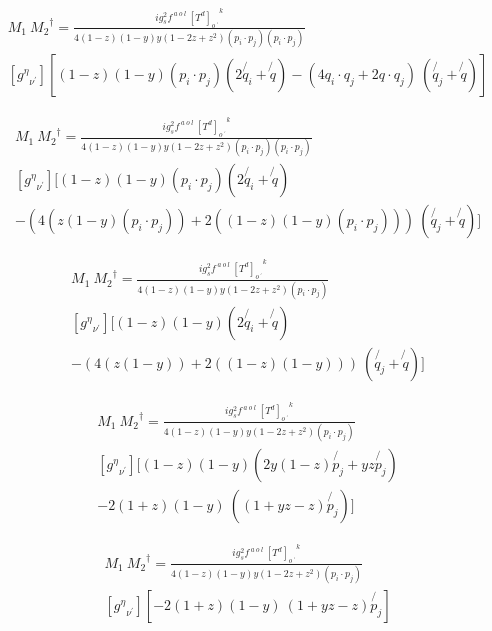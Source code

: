 \begin{equation}
\begin{split}
M_1\:{M_2}^{\dagger}=\frac{ig_s ^2 f^{\:a\:o\:l}\: {[T^d]_{o\:^{\prime}}}^k}{4(1-z)(1-y)y(1-2z+z^2)(p_i \cdot p_j)(p_i \cdot p_j)}\\
[{g^{{\eta}}}_{{\nu}^{\prime}}][(1-z)(1-y) (p_i \cdot p_j)(2\not{q_i} +\not{q})-(4q_i\cdot q_j +2q\cdot q_j)\:(\not{q_j} + \not{q})]
\end{split}
\end{equation}

\begin{equation}
\begin{split}
M_1\:{M_2}^{\dagger}=\frac{ig_s ^2 f^{\:a\:o\:l}\: {[T^d]_{o\:^{\prime}}}^k}{4(1-z)(1-y)y(1-2z+z^2)(p_i \cdot p_j)(p_i \cdot p_j)}\\
[{g^{{\eta}}}_{{\nu}^{\prime}}][(1-z)(1-y) (p_i \cdot p_j)(2\not{q_i}+\not{q})\\
-(4(z(1-y) (p_i \cdot p_j)) +2((1-z)(1-y) (p_i \cdot p_j)))\:(\not{q_j} + \not{q})]
\end{split}
\end{equation}

\begin{equation}
\begin{split}
M_1\:{M_2}^{\dagger}=\frac{ig_s ^2 f^{\:a\:o\:l}\: {[T^d]_{o\:^{\prime}}}^k}{4(1-z)(1-y)y(1-2z+z^2)(p_i \cdot p_j)}\\
[{g^{{\eta}}}_{{\nu}^{\prime}}][(1-z)(1-y) (2\not{q_i}+\not{q})\\
-(4(z(1-y)) +2((1-z)(1-y) ))\:(\not{q_j} + \not{q})]
\end{split}
\end{equation}

\begin{equation}
\begin{split}
M_1\:{M_2}^{\dagger}=\frac{ig_s ^2 f^{\:a\:o\:l}\: {[T^d]_{o\:^{\prime}}}^k}{4(1-z)(1-y)y(1-2z+z^2)(p_i \cdot p_j)}\\
[{g^{{\eta}}}_{{\nu}^{\prime}}][(1-z)(1-y) (2y(1-z)\not{p_j}+yz\not{p_j})\\
-2(1+z)(1-y)\:((1+yz-z)\not{p_j})]
\end{split}
\end{equation}

\begin{equation}
\begin{split}
M_1\:{M_2}^{\dagger}=\frac{ig_s ^2 f^{\:a\:o\:l}\: {[T^d]_{o\:^{\prime}}}^k}{4(1-z)(1-y)y(1-2z+z^2)(p_i \cdot p_j)}\\
[{g^{{\eta}}}_{{\nu}^{\prime}}][-2(1+z)(1-y)\:(1+yz-z)\not{p_j}]
\end{split}
\end{equation}

